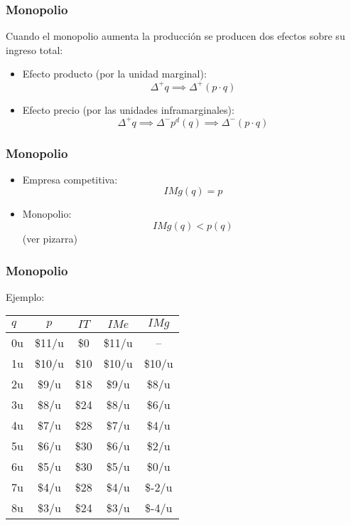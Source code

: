 \documentclass[dvipsnames,table,leqno]{beamer}
\newcommand{\peq}[1]{{\scriptscriptstyle{#1}}}
\newcommand{\rp}[1]{\left(#1\right)}
\begin{document}
		\begin{frame}
			\frametitle{Monopolio}
			Cuando el monopolio aumenta la producción se producen dos efectos sobre su ingreso total:
			\begin{itemize}
				\item Efecto producto (por la unidad marginal): $$\Delta^\peq{+}q\implies\Delta^\peq{+}\rp{p\cdot q}$$
				\item Efecto precio (por las unidades inframarginales): $$\Delta^\peq{+}q\implies\Delta^\peq{-}p^\peq{d}\rp{q}\implies\Delta^\peq{-}\rp{p\cdot q}$$  
			\end{itemize}
		\end{frame}

		\begin{frame}
			\frametitle{Monopolio}
			\begin{itemize}
				\item Empresa competitiva: $$IMg\rp{q}=p$$
				\item Monopolio: $$IMg\rp{q}<p\rp{q}$$ (ver pizarra)
			\end{itemize}
		\end{frame}
	
		\begin{frame}
			\frametitle{Monopolio}
			Ejemplo:
			\begin{table}[htbp!]
				\centering
					\begin{tabular}{|l|c|c|c|c|}\hline
						$q$&	$p$	&$IT$&$IMe$&$IMg$\\ [1ex] \hline 
						0u &\$11/u&\$0 &\$11/u& --	 \\ \hline
						1u &\$10/u&\$10&\$10/u&\$10/u \\ \hline
						2u &\$9/u	&\$18&\$9/u	&\$8/u\\ \hline
						3u &\$8/u &\$24&\$8/u &\$6/u\\ \hline
						4u &\$7/u	&\$28&\$7/u	&\$4/u\\ \hline
						5u &\$6/u	&\$30&\$6/u	&\$2/u\\ \hline
						6u &\$5/u	&\$30&\$5/u	&\$0/u\\ \hline
						7u &\$4/u	&\$28&\$4/u &\$-2/u\\ \hline
						8u &\$3/u	&\$24&\$3/u	&\$-4/u\\ \hline
					\end{tabular}%
			\end{table}
		\end{frame}
\end{document}
